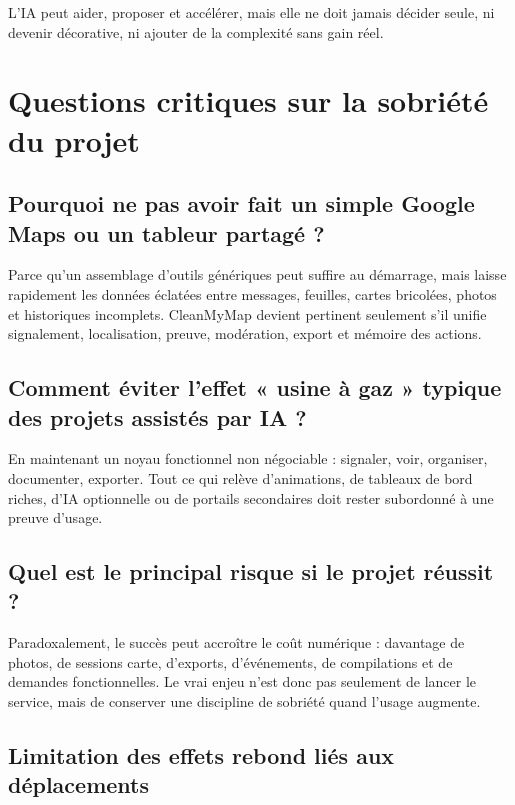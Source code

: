 \documentclass[
  10pt,
  a4paper,
  DIV=11,
  numbers=noendperiod,
  oneside]{scrreprt}
\begin{document}
L'IA peut aider, proposer et accélérer, mais elle ne doit jamais décider
seule, ni devenir décorative, ni ajouter de la complexité sans gain
réel.

\section{Questions critiques sur la sobriété du
projet}\label{questions-critiques-sur-la-sobriuxe9tuxe9-du-projet}

\subsection{Pourquoi ne pas avoir fait un simple Google Maps ou un
tableur partagé
?}\label{pourquoi-ne-pas-avoir-fait-un-simple-google-maps-ou-un-tableur-partaguxe9}

Parce qu'un assemblage d'outils génériques peut suffire au démarrage,
mais laisse rapidement les données éclatées entre messages, feuilles,
cartes bricolées, photos et historiques incomplets. CleanMyMap devient
pertinent seulement s'il unifie signalement, localisation, preuve,
modération, export et mémoire des actions.

\subsection{Comment éviter l'effet « usine à gaz » typique des projets
assistés par IA
?}\label{comment-uxe9viter-leffet-usine-uxe0-gaz-typique-des-projets-assistuxe9s-par-ia}

En maintenant un noyau fonctionnel non négociable : signaler, voir,
organiser, documenter, exporter. Tout ce qui relève d'animations, de
tableaux de bord riches, d'IA optionnelle ou de portails secondaires
doit rester subordonné à une preuve d'usage.

\subsection{Quel est le principal risque si le projet réussit
?}\label{quel-est-le-principal-risque-si-le-projet-ruxe9ussit}

Paradoxalement, le succès peut accroître le coût numérique : davantage
de photos, de sessions carte, d'exports, d'événements, de compilations
et de demandes fonctionnelles. Le vrai enjeu n'est donc pas seulement de
lancer le service, mais de conserver une discipline de sobriété quand
l'usage augmente.

\subsection{Limitation des effets rebond liés aux
déplacements}\label{limitation-des-effets-rebond-liuxe9s-aux-duxe9placements}
\end{document}
